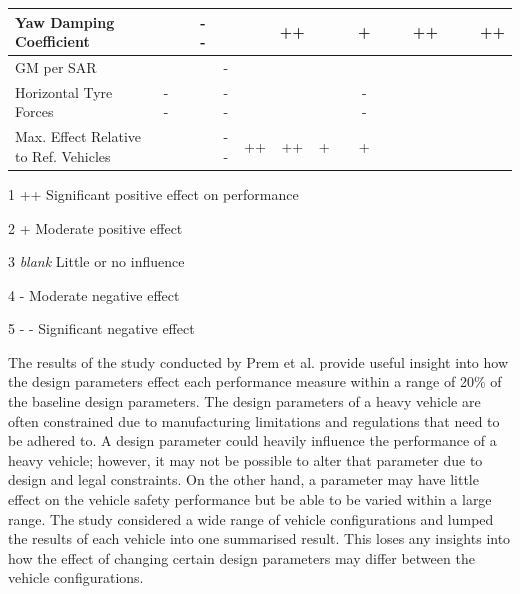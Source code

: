 \begin{table}[H]
\begin{threeparttable}
\begin{tabulary}{\textwidth}{|L|c|c|c|c|c|c|c|c|c|c|c|c|c|c|c|}
            \hline
            Yaw Damping Coefficient &       &       & - -    &       &       & ++    &       &       & +     &       &       & ++    &       &       & ++ \bigstrut\\
            \hline
            GM per SAR &       &       &       & -     &       &       &       &       &       &       &       &       &       &       &  \bigstrut\\
            \hline
            Horizontal Tyre Forces & - -    &       &       & - -    &       &       &       &       & - -    &       &       &       &       &       &  \bigstrut\\
            \hline
            Max. Effect Relative to Ref. Vehicles &       &       &       & - -    & ++    & ++    & +     &       & +     &       &       &       &       &       &  \bigstrut\\
            \hline
        \end{tabulary}%
        \label{table:influence-of-design-features-performance-characteristics-of-australian-fleet}
        \begin{tablenotes}
            \item[1] ++ Significant positive effect on performance
            \item[2] + Moderate positive effect
            \item[3] \textit{blank} Little or no influence
            \item[4] - Moderate negative effect
            \item[5] - - Significant negative effect
        \end{tablenotes}
    \end{threeparttable}
\end{table}%

The results of the study conducted by Prem et al. provide useful insight into how the design parameters effect each performance measure within a range of 20\% of the baseline design parameters. The design parameters of a heavy vehicle are often constrained due to manufacturing limitations and regulations that need to be adhered to. A design parameter could heavily influence the performance of a heavy vehicle; however, it may not be possible to alter that parameter due to design and legal constraints. On the other hand, a parameter may have little effect on the vehicle safety performance but be able to be varied within a large range. The study considered a wide range of vehicle configurations and lumped the results of each vehicle into one summarised result. This loses any insights into how the effect of changing certain design parameters may differ between the vehicle configurations.

